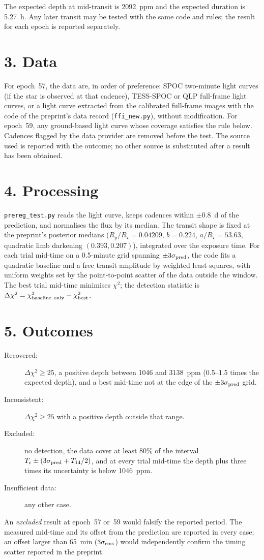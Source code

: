\documentclass[11pt]{article}
\begin{document}
The expected depth at mid-transit is 2092~ppm and the expected duration is 5.27~h. Any later transit may be tested with the same code and rules; the result for each epoch is reported separately.

\section*{3. Data}
For epoch~57, the data are, in order of preference: SPOC two-minute light curves (if the star is observed at that cadence), TESS-SPOC or QLP full-frame light curves, or a light curve extracted from the calibrated full-frame images with the code of the preprint's data record (\texttt{ffi\_new.py}), without modification. For epoch~59, any ground-based light curve whose coverage satisfies the rule below. Cadences flagged by the data provider are removed before the test. The source used is reported with the outcome; no other source is substituted after a result has been obtained.

\section*{4. Processing}
\texttt{prereg\_test.py} reads the light curve, keeps cadences within $\pm 0.8$~d of the prediction, and normalises the flux by its median. The transit shape is fixed at the preprint's posterior medians ($R_p/R_\star = 0.04209$, $b = 0.224$, $a/R_\star = 53.63$, quadratic limb darkening $(0.393, 0.207)$), integrated over the exposure time. For each trial mid-time on a 0.5-minute grid spanning $\pm 3\sigma_{\rm pred}$, the code fits a quadratic baseline and a free transit amplitude by weighted least squares, with uniform weights set by the point-to-point scatter of the data outside the window. The best trial mid-time minimises $\chi^2$; the detection statistic is $\Delta\chi^2 = \chi^2_{\rm baseline\ only} - \chi^2_{\rm best}$.

\section*{5. Outcomes}
\begin{description}
\item[Recovered:] $\Delta\chi^2 \geq 25$, a positive depth between 1046 and 3138~ppm (0.5--1.5 times the expected depth), and a best mid-time not at the edge of the $\pm 3\sigma_{\rm pred}$ grid.
\item[Inconsistent:] $\Delta\chi^2 \geq 25$ with a positive depth outside that range.
\item[Excluded:] no detection, the data cover at least 80\% of the interval $T_c \pm (3\sigma_{\rm pred} + T_{14}/2)$, and at every trial mid-time the depth plus three times its uncertainty is below 1046~ppm.
\item[Insufficient data:] any other case.
\end{description}
An \emph{excluded} result at epoch~57 or~59 would falsify the reported period. The measured mid-time and its offset from the prediction are reported in every case; an offset larger than 65~min ($3\sigma_{\rm rms}$) would independently confirm the timing scatter reported in the preprint.
\end{document}
